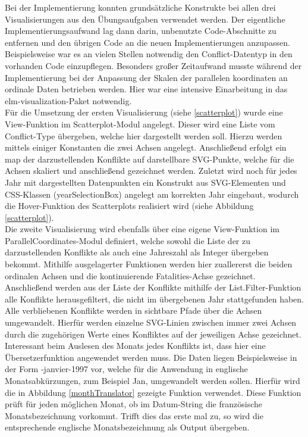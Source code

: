 \documentclass[usegeometry=true]{scrartcl}
\begin{document}
Bei der Implementierung konnten grundsätzliche Konstrukte bei allen drei Visualisierungen aus den Übungsaufgaben verwendet werden. Der eigentliche Implementierungsaufwand lag dann darin, unbenutzte Code-Abschnitte zu entfernen und den übrigen Code an die neuen Implementierungen anzupassen. Beispielsweise war es an vielen Stellen notwendig den Conflict-Datentyp in den vorhanden Code einzupflegen. Besonders großer Zeitaufwand musste während der Implementierung bei der Anpassung der Skalen der parallelen koordinaten an ordinale Daten betrieben werden. Hier war eine intensive Einarbeitung in das elm-visualization-Paket \cite{elm-vis} notwendig.\\

Für die Umsetzung der ersten Visualisierung (siehe \ref{scatterplot}) wurde eine View-Funktion im Scatterplot-Modul angelegt. Dieser wird eine Liste vom Conflict-Type übergeben, welche hier dargestellt werden soll. Hierzu werden mittels einiger Konstanten die zwei Achsen angelegt. Anschließend erfolgt ein map der darzustellenden Konflikte auf darstellbare SVG-Punkte, welche für die Achsen skaliert und anschließend gezeichnet werden. Zuletzt wird noch für jedes Jahr mit dargestellten Datenpunkten ein Konstrukt aus SVG-Elementen und CSS-Klassen (\glqq yearSelectionBox\grqq) angelegt am korrekten Jahr eingebaut, wodurch die Hover-Funktion des Scatterplots realisiert wird (siehe Abbildung \ref{scatterplot}).\\ 

Die zweite Visualisierung wird ebenfalls über eine eigene View-Funktion im ParallelCoordinates-Modul definiert, welche sowohl die Liste der zu darzustellenden Konflikte als auch eine Jahreszahl als Integer übergeben bekommt. Mithilfe ausgelagerter Funktionen werden hier zuallererst die beiden ordinalen Achsen und die kontinuierende \glqq Fatalities\grqq-Achse gezeichnet. Anschließend werden aus der Liste der Konflikte mithilfe der List.Filter-Funktion alle Konflikte herausgefiltert, die nicht im übergebenen Jahr stattgefunden haben. Alle verbliebenen Konflikte werden in sichtbare Pfade über die Achsen umgewandelt. Hierfür werden einzelne SVG-Linien zwischen immer zwei Achsen durch die zugehörigen Werte eines Konfliktes auf der jeweiligen Achse gezeichnet. Interessant beim Auslesen des Monats jedes Konflikts ist, dass hier eine Übersetzerfunktion angewendet werden muss. Die Daten liegen Beispielsweise in der Form -janvier-1997\grqq{} vor, welche für die Anwendung in englische Monatsabkürzungen, zum Beispiel \glqq Jan\grqq, umgewandelt werden sollen. Hierfür wird die in Abbildung \ref{monthTranslator} gezeigte Funktion verwendet. Diese Funktion prüft für jeden möglichen Monat, ob im Datum-String die französische Monatsbezeichnung vorkommt. Trifft dies das erste mal zu, so wird die entsprechende englische Monatsbezeichnung als Output übergeben.\\
\end{document}
